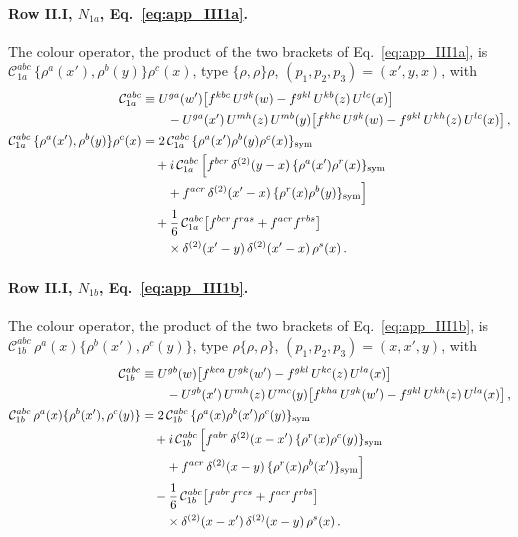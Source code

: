 \paragraph{Row II.I, $N_{1a}$, Eq.~\eqref{eq:app_III1a}.} The colour operator, the product of the two brackets of Eq.~\eqref{eq:app_III1a}, is $\mathcal C^{abc}_{1a}\,\{\rho^a(x'),\rho^b(y)\}\rho^c(x)$, type $\{\rho,\rho\}\rho$, $(p_1,p_2,p_3)=(x',y,x)$, with
\begin{align}
\mathcal C^{abc}_{1a}&\equiv U^{ga}(w')\big[f^{kbc}\,U^{gk}(w)-f^{gkl}\,U^{kb}(z)\,U^{lc}(x)\big]\notag\\
&\qquad-U^{ga}(x')\,U^{mh}(z)\,U^{mb}(y)\big[f^{khc}\,U^{gk}(w)-f^{gkl}\,U^{kh}(z)\,U^{lc}(x)\big]\,,\notag\\
\mathcal C^{abc}_{1a}\,\{\rho^a(x'),\rho^b(y)\}\rho^c(x)
&=2\,\mathcal C^{abc}_{1a}\,\{\rho^a(x')\rho^b(y)\rho^c(x)\}_{\rm sym}\notag\\
&\quad+i\,\mathcal C^{abc}_{1a}\,\Big[f^{bcr}\,\delta^{(2)}(y-x)\,\{\rho^{a}(x')\rho^{r}(x)\}_{\rm sym}\notag\\
&\qquad+f^{acr}\,\delta^{(2)}(x'-x)\,\{\rho^{r}(x)\rho^{b}(y)\}_{\rm sym}\Big]\notag\\
&\quad+\frac16\,\mathcal C^{abc}_{1a}\big[f^{bcr}f^{ras}+f^{acr}f^{rbs}\big]\notag\\
&\qquad\times\delta^{(2)}(x'-y)\,\delta^{(2)}(x'-x)\,\rho^s(x)\,.\label{eq:app_sym_III1a}
\end{align}
\paragraph{Row II.I, $N_{1b}$, Eq.~\eqref{eq:app_III1b}.} The colour operator, the product of the two brackets of Eq.~\eqref{eq:app_III1b}, is $\mathcal C^{abc}_{1b}\,\rho^a(x)\{\rho^b(x'),\rho^c(y)\}$, type $\rho\{\rho,\rho\}$, $(p_1,p_2,p_3)=(x,x',y)$, with
\begin{align}
\mathcal C^{abc}_{1b}&\equiv U^{gb}(w)\big[f^{kca}\,U^{gk}(w')-f^{gkl}\,U^{kc}(z)\,U^{la}(x)\big]\notag\\
&\qquad-U^{gb}(x')\,U^{mh}(z)\,U^{mc}(y)\big[f^{kha}\,U^{gk}(w')-f^{gkl}\,U^{kh}(z)\,U^{la}(x)\big]\,,\notag\\
\mathcal C^{abc}_{1b}\,\rho^a(x)\{\rho^b(x'),\rho^c(y)\}
&=2\,\mathcal C^{abc}_{1b}\,\{\rho^a(x)\rho^b(x')\rho^c(y)\}_{\rm sym}\notag\\
&\quad+i\,\mathcal C^{abc}_{1b}\,\Big[f^{abr}\,\delta^{(2)}(x-x')\,\{\rho^{r}(x)\rho^{c}(y)\}_{\rm sym}\notag\\
&\qquad+f^{acr}\,\delta^{(2)}(x-y)\,\{\rho^{r}(x)\rho^{b}(x')\}_{\rm sym}\Big]\notag\\
&\quad-\frac16\,\mathcal C^{abc}_{1b}\big[f^{abr}f^{rcs}+f^{acr}f^{rbs}\big]\notag\\
&\qquad\times\delta^{(2)}(x-x')\,\delta^{(2)}(x-y)\,\rho^s(x)\,.\label{eq:app_sym_III1b}
\end{align}
